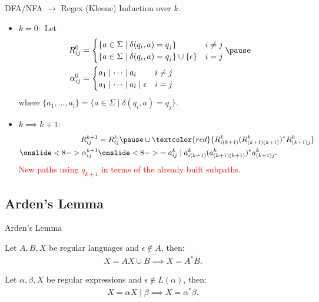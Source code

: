 \documentclass{beamer}
\def\r{\textcolor{red}}
\begin{document}
\begin{frame}{DFA/NFA $\to$ Regex (Kleene)}
    Induction over $k$.
    \begin{itemize}
        \item $k = 0$:\pause\ Let
            \begin{align*}
                R_{ij}^0 &= \begin{cases}
                    \{a \in \Sigma \mid \delta(q_i, a) = q_j\} & i \neq j \\
                    \{a \in \Sigma \mid \delta(q_i, a) = q_j\} \cup \{\epsilon\} & i = j
                \end{cases}\pause \\
                \alpha_{ij}^0 &= \begin{cases}
                    a_1 \mid \dots \mid a_l & i \neq j \\
                    a_1 \mid \dots \mid a_l \mid \epsilon & i = j
                \end{cases}
            \end{align*}\pause
            where $\{a_1, \dots, a_l\} = \{a \in \Sigma \mid \delta(q_i, a) = q_j\}$.\pause
        \item $k \implies k + 1$:\pause
            \begin{align*}
                R_{ij}^{k+1} &= R_{ij}^k\pause \cup \r{R_{i(k+1)}^k (R_{(k+1)(k+1)}^k)^* R_{(k+1)j}^k} \\
                \onslide<8->{\alpha_{ij}^{k+1}} &\onslide<8->{= a_{ij}^k \mid a_{i(k+1)}^k (a_{(k+1)(k+1)}^k)^* a_{(k+1)j}^k.
                }
            \end{align*}
            \r{New paths using $q_{k+1}$ in terms of the already built subpaths.}
    \end{itemize}
\end{frame}

\subsection{Arden's Lemma}

\begin{frame}{Arden's Lemma}
    \begin{theorem}
        Let $A, B, X$ be regular languages and $\epsilon \not\in A$, then:
        \begin{align*}
            X = AX \cup B \implies X = A^* B.
        \end{align*}
    \end{theorem}\pause
    \begin{theorem}
        Let $\alpha, \beta, X$ be regular expressions and $\epsilon \not\in L(\alpha)$, then:
        \begin{align*}
            X = \alpha X \mid \beta \implies X = \alpha^* \beta.
        \end{align*}
    \end{theorem}
\end{frame}
\end{document}
